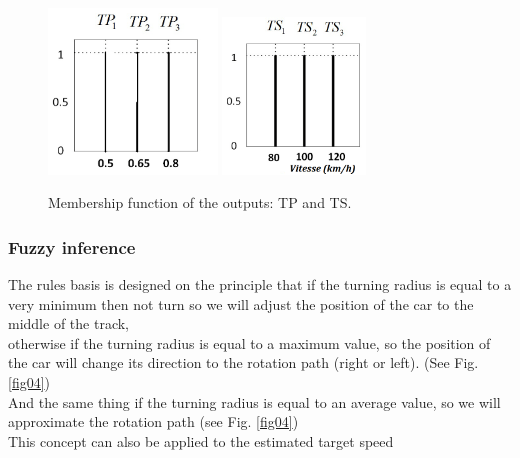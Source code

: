 \documentclass{llncs}
\begin{document}
\begin{figure}[h!]
	
	\centering
	\includegraphics[width=0.4\textwidth]{fig/dis.png}
	\includegraphics[width=0.34\textwidth]{fig/speed1.png}
	\begin{minipage}{10cm}
		\centering
		\caption{\footnotesize Membership function of the outputs: TP and TS.}
		\label{fig38}
	\end{minipage} 
	
\end{figure}
\subsubsection{Fuzzy inference}
The rules basis is designed on the principle that if the turning radius is equal to a very minimum then not turn so we will adjust the position of the car to the middle of the track, \\
otherwise if the turning radius is equal to a maximum value, so the position of the car will change its direction to the rotation path (right or left). (See Fig. \ref {fig04}) \\
And the same thing if the turning radius is equal to an average value, so we will approximate the rotation path (see Fig. \ref{fig04}) \\
This concept can also be applied to the estimated target speed \\
\end{document}
